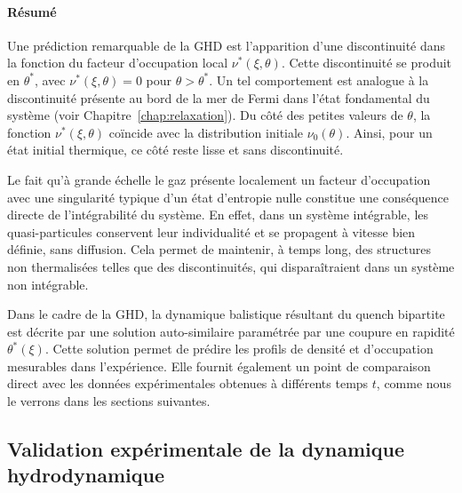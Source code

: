 \paragraph{Résumé}

Une prédiction remarquable de la GHD est l’apparition d’une discontinuité dans la fonction du facteur d’occupation local $\nu^*(\xi,\theta)$. Cette discontinuité se produit en $\theta^*$, avec $\nu^*(\xi,\theta)=0$ pour $\theta>\theta^*$. Un tel comportement est analogue à la discontinuité présente au bord de la mer de Fermi dans l’état fondamental du système (voir Chapitre~\ref{chap:relaxation}). Du côté des petites valeurs de $\theta$, la fonction $\nu^*(\xi,\theta)$ coïncide avec la distribution initiale $\nu_0(\theta)$. Ainsi, pour un état initial thermique, ce côté reste lisse et sans discontinuité.  

\medskip

Le fait qu’à grande échelle le gaz présente localement un facteur d’occupation avec une singularité typique d’un état d’entropie nulle constitue une conséquence directe de l’intégrabilité du système. En effet, dans un système intégrable, les quasi-particules conservent leur individualité et se propagent à vitesse bien définie, sans diffusion. Cela permet de maintenir, à temps long, des structures non thermalisées telles que des discontinuités, qui disparaîtraient dans un système non intégrable.

\medskip

Dans le cadre de la \gls{GHD}, la dynamique balistique résultant du quench bipartite est décrite par une solution auto-similaire paramétrée par une coupure en rapidité $\theta^*(\xi)$. Cette solution permet de prédire les profils de densité et d’occupation mesurables dans l’expérience. Elle fournit également un point de comparaison direct avec les données expérimentales obtenues à différents temps $t$, comme nous le verrons dans les sections suivantes.


\subsection{Validation expérimentale de la dynamique hydrodynamique}
\label{sec.don_exp}



